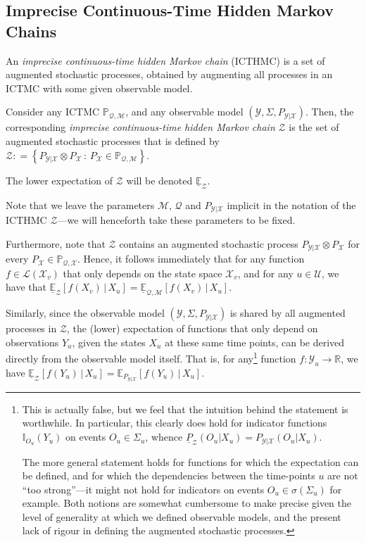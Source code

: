 \documentclass[twoside,11pt]{article}
\newcommand{\reals}{\mathbb{R}}
\newcommand{\states}{\mathcal{X}}
\newcommand{\observs}{\mathcal{Y}}
\newcommand{\lexp}{\underline{\mathbb{E}}_{\rateset,\mathcal{M}}}
\newcommand{\gambles}{\mathcal{L}}
\newcommand{\ind}[1]{\mathbb{I}_{#1}}
\newcommand{\rateset}{\mathcal{Q}}
\newcommand{\coloneqq}{:\!=}
\begin{document}
\subsection{Imprecise Continuous-Time Hidden Markov Chains}\label{subsec:ICTHMC}

An \emph{imprecise continuous-time hidden Markov chain} (ICTHMC) is a set of augmented stochastic processes, obtained by augmenting all processes in an ICTMC with some given observable model.
\begin{definition}[ICTHMC]\label{def:hidden_ictmc}
Consider any ICTMC $\mathbb{P}_{\rateset,\mathcal{M}}$, and any observable model $(\observs,\Sigma,P_{\observs\vert\states})$. Then, the corresponding \emph{imprecise continuous-time hidden Markov chain} $\mathcal{Z}$ is the set of augmented stochastic processes that is defined by
$\mathcal{Z} \coloneqq \left\{ P_{\observs\vert\states}\otimes P_{\states} \,:\, P_{\states}\in\mathbb{P}_{\rateset,\mathcal{M}}\right\}$.

The lower expectation of $\mathcal{Z}$ will be denoted $\underline{\mathbb{E}}_\mathcal{Z}$.
\end{definition}
Note that we leave the parameters $\mathcal{M}$, $\rateset$ and $P_{\observs\vert\states}$ implicit in the notation of the ICTHMC $\mathcal{Z}$---we will henceforth take these parameters to be fixed.

Furthermore, note that $\mathcal{Z}$ contains an augmented stochastic process $P_{\observs\vert\states}\otimes P_{\states}$ for every $P_{\states}\in\mathbb{P}_{\rateset,\states}$. Hence, it follows immediately that for any function $f\in\gambles(\states_v)$ that only depends on the state space $\states_v$, and for any $u\in\mathcal{U}$, we have that $\underline{\mathbb{E}}_\mathcal{Z}[f(X_v)\,\vert\,X_u]=\lexp[f(X_v)\,\vert\,X_u]$. 

Similarly, since the observable model $(\observs,\Sigma,P_{\observs\vert\states})$ is shared by all augmented processes in $\mathcal{Z}$, the (lower) expectation of functions that only depend on observations $Y_u$, given the states $X_u$ at these same time points, can be derived directly from the observable model itself. That is, for any\footnote{This is actually false, but we feel that the intuition behind the statement is worthwhile. In particular, this clearly does hold for indicator functions $\ind{O_u}(Y_u)$ on events $O_u\in\Sigma_u$, whence $\underline{P}_\mathcal{Z}(O_u\vert X_u)=P_{\observs\vert\states}(O_u\vert X_u)$.

The more general statement holds for functions for which the expectation can be defined, and for which the dependencies between the time-points $u$ are not ``too strong''---it might not hold for indicators on events $O_u\in\sigma(\Sigma_u)$ for example. Both notions are somewhat cumbersome to make precise given the level of generality at which we defined observable models, and the present lack of rigour in defining the augmented stochastic processes.} function $f:\observs_u\to\reals$, we have $\underline{\mathbb{E}}_\mathcal{Z}[f(Y_u)\,\vert\,X_u]=\mathbb{E}_{P_{\observs\vert\states}}[f(Y_u)\,\vert\,X_u]$.
\end{document}
